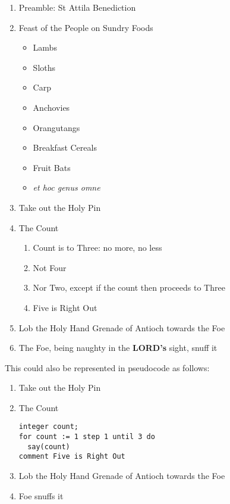 \documentclass{metanorma}
\let\bcp\relax%
\begin{document}
\begin{enumerate}
  \item Preamble: St Attila Benediction
  \item Feast of the People on Sundry Foods
    \begin{itemize}
      \item Lambs
      \item Sloths
      \item Carp
      \item Anchovies
      \item Orangutangs
      \item Breakfast Cereals
      \item Fruit Bats
      \item \textit{et hoc genus omne}
    \end{itemize}

  \item Take out the Holy Pin
  \item The Count

  \begin{enumerate}
    \item Count is to Three: no more, no less
    \item Not Four
    \item Nor Two, except if the count then proceeds to Three
    \item Five is Right Out
  \end{enumerate}

  \item Lob the Holy Hand Grenade of Antioch towards the Foe
  \item The Foe, being naughty in the \textbf{LORD's} sight, \bcp{shall} snuff it

\end{enumerate}


This could also be represented in pseudocode as follows:


\begin{enumerate}
  \item Take out the Holy Pin
  \item The Count

\begin{verbatim}
integer count;
for count := 1 step 1 until 3 do
  say(count)
comment Five is Right Out
\end{verbatim}

  \item Lob the Holy Hand Grenade of Antioch towards the Foe
  \item Foe snuffs it

\end{enumerate}
\end{document}
